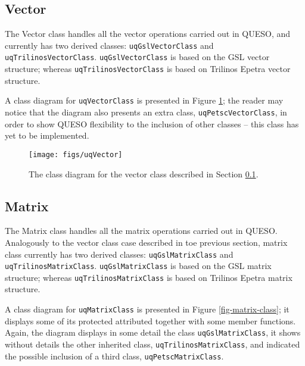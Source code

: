 \subsection{Vector}\label{sec:vector_class}


The Vector class handles all the vector operations carried out in QUESO, and currently has two derived classes: \verb+uqGslVectorClass+ and \verb+uqTrilinosVectorClass+. \verb+uqGslVectorClass+ is based on the GSL vector structure; whereas \verb+uqTrilinosVectorClass+ is based on Trilinos Epetra vector structure.  

A class diagram for \verb+uqVectorClass+  is presented in Figure \ref{fig-vector-class}; the reader may notice that the diagram also presents an extra class, \verb+uqPetscVectorClass+, in order to show QUESO flexibility to the inclusion of other classes -- this class has yet to be implemented.


\begin{figure}[!htpb]
\centering
\texttt{[image: figs/uqVector]}
\vspace*{-8pt}
\caption{ The class diagram for the vector class described in Section \ref{sec:vector_class}.}
\label{fig-vector-class}
\end{figure}



\subsection{Matrix}\label{sec:matrix_class}



The Matrix class handles all the matrix operations carried out in QUESO.  Analogously to the vector class case described in toe previous section,
matrix class currently has two derived classes: \verb+uqGslMatrixClass+ and \verb+uqTrilinosMatrixClass+. \verb+uqGslMatrixClass+ is based on the GSL matrix structure; whereas \verb+uqTrilinosMatrixClass+ is based on Trilinos Epetra matrix structure.

A class diagram for \verb+uqMatrixClass+  is presented in Figure \ref{fig-matrix-class}; it displays some of its protected attributed together with  some member functions. Again, the diagram displays in some detail the class \verb+uqGslMatrixClass+, it shows without details the other inherited class, \verb+uqTrilinosMatrixClass+, and indicated the possible inclusion of a third class, \verb+uqPetscMatrixClass+.




